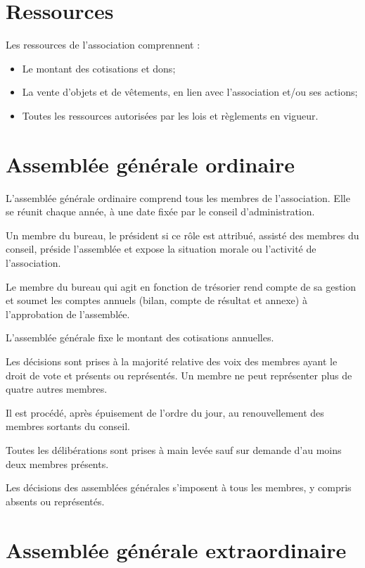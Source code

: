 \documentclass[11 pt]{article}
\begin{document}
\section{Ressources}

Les ressources de l’association comprennent :

\begin{itemize}
\item Le montant des cotisations et dons;
\item La vente d’objets et de vêtements, en lien avec l’association
  et/ou ses actions;
\item Toutes les ressources autorisées par les lois et règlements en
  vigueur.
\end{itemize}


\section{Assemblée générale ordinaire}

L’assemblée générale ordinaire comprend tous les membres de
l’association. Elle se réunit chaque année, à une date fixée par le
conseil d’administration.

Un membre du bureau, le président si ce rôle est attribué, assisté des
membres du conseil, préside l’assemblée et expose la situation morale
ou l’activité de l’association.

Le membre du bureau qui agit en fonction de trésorier rend compte de
sa gestion et soumet les comptes annuels (bilan, compte de résultat et
annexe) à l’approbation de l’assemblée.

L’assemblée générale fixe le montant des cotisations annuelles.

Les décisions sont prises à la majorité relative des voix des membres
ayant le droit de vote et présents ou représentés. Un membre ne peut
représenter plus de quatre autres membres.

Il est procédé, après épuisement de l’ordre du jour, au renouvellement
des membres sortants du conseil.

Toutes les délibérations sont prises à main levée sauf sur demande
d’au moins deux membres présents.

Les décisions des assemblées générales s’imposent à tous les membres,
y compris absents ou représentés.


\section{Assemblée générale extraordinaire}
\end{document}
